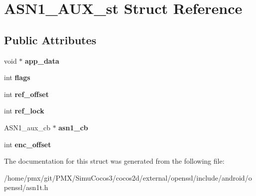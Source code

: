 \hypertarget{structASN1__AUX__st}{}\section{A\+S\+N1\+\_\+\+A\+U\+X\+\_\+st Struct Reference}
\label{structASN1__AUX__st}
\subsection*{Public Attributes}
\begin{DoxyCompactItemize}
\item 
\mbox{\label{structASN1__AUX__st_aacd1dbeca7065e0773c34416bf771741}} 
void $\ast$ {\bfseries app\+\_\+data}
\item 
\mbox{\label{structASN1__AUX__st_a852e7951bbea693ec9616bac686455c6}} 
int {\bfseries flags}
\item 
\mbox{\label{structASN1__AUX__st_a7bf75280ea384bfda6f280e97a214f8a}} 
int {\bfseries ref\+\_\+offset}
\item 
\mbox{\label{structASN1__AUX__st_ab8dd18bd614e4346bae42e2da5046be6}} 
int {\bfseries ref\+\_\+lock}
\item 
\mbox{\label{structASN1__AUX__st_a7c927b5c791e3ded8276beb5328b23f1}} 
A\+S\+N1\+\_\+aux\+\_\+cb $\ast$ {\bfseries asn1\+\_\+cb}
\item 
\mbox{\label{structASN1__AUX__st_a71b62b72c2eff33605ff2e3f4d833c15}} 
int {\bfseries enc\+\_\+offset}
\end{DoxyCompactItemize}


The documentation for this struct was generated from the following file\+:\begin{DoxyCompactItemize}
\item 
/home/pmx/git/\+P\+M\+X/\+Simu\+Cocos3/cocos2d/external/openssl/include/android/openssl/asn1t.\+h\end{DoxyCompactItemize}
